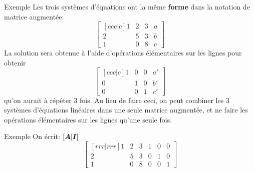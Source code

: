 \documentclass[french]{beamer}
\begin{document}
\begin{frame}{Exemple}
Les trois systèmes d'équations ont la même \textbf{forme} dans la notation de matrice augmentée:
\[
\begin{bmatrix}[ccc|c]
1 & 2 & 3 & a\\
2 & 5 & 3 & b\\
1 & 0 & 8 & c
\end{bmatrix}
\]
La solution sera obtenue à l'aide d'opérations élémentaires sur les lignes
pour obtenir
\[
\begin{bmatrix}[ccc|c]
1 & 0 & 0 & a'\\
0 & 1 & 0 & b'\\
0 & 0 & 1 & c'
\end{bmatrix}
\]
qu'on aurait à répéter 3 fois.  Au lieu de faire ceci, on peut combiner les
3 systèmes d'équations linéaires dans une seule matrice augmentée, et ne
faire les opérations élémentaires sur les lignes qu'une seule fois.
\end{frame}

\begin{frame}{Exemple}
On écrit: $[\boldsymbol{A}|\boldsymbol{I}]$
\[
\begin{bmatrix}[rrr|rrr]
1 & 2 & 3 & 1 & 0 & 0\\
2 & 5 & 3 & 0 & 1 & 0 \\
1 & 0 & 8 & 0 & 0 & 1
\end{bmatrix}
\]
\end{frame}
\end{document}
